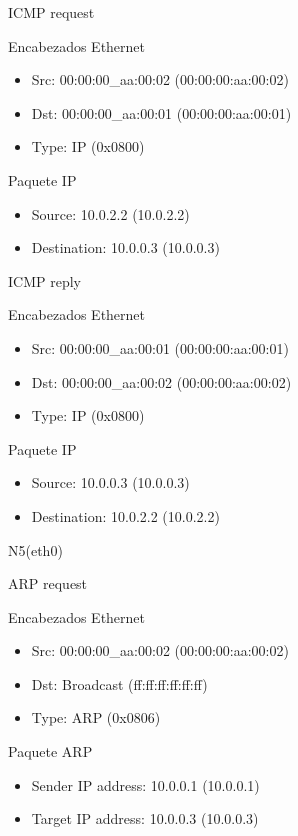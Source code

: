 \documentclass[a4paper,11pt]{article} %
\begin{document}
\setlength{\leftskip}{1cm}ICMP request

\indent\indent Encabezados Ethernet
\begin{itemize}
    \setlength{\itemindent}{80px}
    \item Src: 00:00:00\_aa:00:02 (00:00:00:aa:00:02)
    \item Dst: 00:00:00\_aa:00:01 (00:00:00:aa:00:01)
    \item Type: IP (0x0800)
\end{itemize}

\indent\indent Paquete IP
\begin{itemize}
    \setlength{\itemindent}{80px}
    \item Source: 10.0.2.2 (10.0.2.2)
    \item Destination: 10.0.0.3 (10.0.0.3)
\end{itemize}

\setlength{\leftskip}{1cm}ICMP reply

\indent\indent Encabezados Ethernet
\begin{itemize}
    \setlength{\itemindent}{80px}
    \item Src: 00:00:00\_aa:00:01 (00:00:00:aa:00:01)
    \item Dst: 00:00:00\_aa:00:02 (00:00:00:aa:00:02)
    \item Type: IP (0x0800)
\end{itemize}

\indent\indent Paquete IP
\begin{itemize}
    \setlength{\itemindent}{80px}
    \item Source: 10.0.0.3 (10.0.0.3)
    \item Destination: 10.0.2.2 (10.0.2.2)
\end{itemize}

\setlength{\leftskip}{0.5cm}N5(eth0)

\setlength{\leftskip}{1cm}ARP request\par
\indent\indent Encabezados Ethernet
\begin{itemize}
    \setlength{\itemindent}{80px}
    \item Src: 00:00:00\_aa:00:02 (00:00:00:aa:00:02)
    \item Dst: Broadcast (ff:ff:ff:ff:ff:ff)
    \item Type: ARP (0x0806)
\end{itemize}

\indent\indent Paquete ARP
\begin{itemize}
    \setlength{\itemindent}{80px}
    \item Sender IP address: 10.0.0.1 (10.0.0.1)
    \item Target IP address: 10.0.0.3 (10.0.0.3)
\end{itemize}
\end{document}
